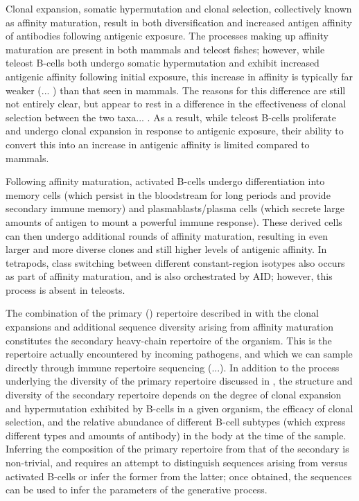 Clonal expansion, somatic hypermutation and clonal selection, collectively known as affinity maturation, result in both diversification and increased antigen affinity of antibodies following antigenic exposure. The processes making up affinity maturation are present in both mammals and teleost fishes; however, while teleost B-cells both undergo somatic hypermutation and exhibit increased antigenic affinity following initial exposure, this increase in affinity is typically far weaker (... %
) than that seen in mammals. The reasons for this difference are still not entirely clear, but appear to rest in a difference in the effectiveness of clonal selection between the two taxa... %
. As a result, while teleost B-cells proliferate and undergo clonal expansion in response to antigenic exposure, their ability to convert this into an increase in antigenic affinity is limited compared to mammals.

Following affinity maturation, activated B-cells undergo differentiation into memory cells (which persist in the bloodstream for long periods and provide secondary immune memory) and plasmablasts/plasma cells %
(which secrete large amounts of antigen to mount a powerful immune response). These derived cells can then undergo additional rounds of affinity maturation, resulting in even larger and more diverse clones and still higher levels of antigenic affinity. %
In tetrapods, class switching between different constant-region isotypes also occurs as part of affinity maturation, and is also orchestrated by AID; however, this process is absent in teleosts.

The combination of the primary (\naive) repertoire described in  with the clonal expansions and additional sequence diversity arising from affinity maturation constitutes the secondary heavy-chain repertoire of the organism. This is the repertoire actually encountered by incoming pathogens, and which we can sample directly through immune repertoire sequencing (...). %
In addition to the process underlying the diversity of the primary repertoire discussed in , the structure and diversity of the secondary repertoire depends on the degree of clonal expansion and hypermutation exhibited by B-cells in a given organism, the efficacy of clonal selection, and the relative abundance of different B-cell subtypes (which express different types and amounts of antibody) in the body at the time of the sample. Inferring the composition of the primary repertoire from that of the secondary is non-trivial, and requires an attempt to distinguish sequences arising from \naive versus activated B-cells or infer the former from the latter; once obtained, the \naive sequences can be used to infer the parameters of the generative process.

